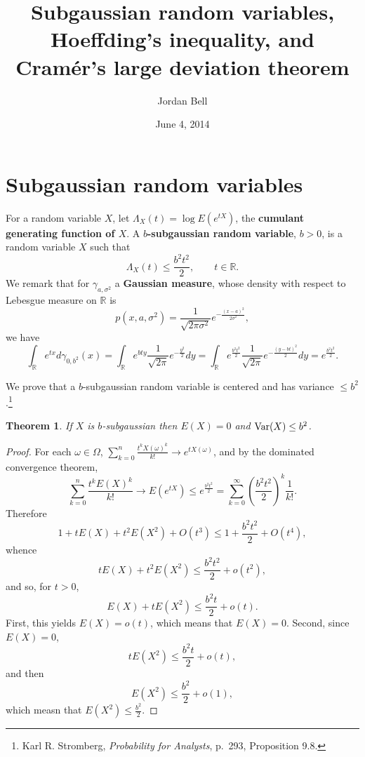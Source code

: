 \documentclass{article}
\newcommand{\Var}{\ensuremath\mathrm{Var}}
\newtheorem{theorem}{Theorem}
\theoremstyle{definition}
\begin{document}
\title{Subgaussian random variables, Hoeffding's inequality, and Cram\'er's large deviation theorem}
\author{Jordan Bell}
\date{June 4, 2014}

\maketitle


\section{Subgaussian random variables}
For a random variable $X$, let $\Lambda_X(t)=\log E(e^{tX})$, the 
\textbf{cumulant generating function of $X$}.
A \textbf{$b$-subgaussian random variable}, $b>0$, is a random variable $X$ such that
\[
\Lambda_X(t) \leq \frac{b^2 t^2}{2}, \qquad t \in \mathbb{R}.
\]
We remark that for $\gamma_{a,\sigma^2}$ a \textbf{Gaussian measure}, whose density with respect to Lebesgue
measure on $\mathbb{R}$ is
\[
p(x,a,\sigma^2)= \frac{1}{\sqrt{2\pi \sigma^2}} e^{-\frac{(x-a)^2}{2\sigma^2}},
\]
we have
\[
\int_\mathbb{R} e^{tx} d\gamma_{0,b^2}(x)
=\int_\mathbb{R} e^{bty} \frac{1}{\sqrt{2\pi}} e^{-\frac{y^2}{2}} dy
=\int_\mathbb{R} e^{\frac{b^2 t^2}{2}} \frac{1}{\sqrt{2\pi}} e^{-\frac{(y-bt)^2}{2}} dy
=e^{\frac{b^2t^2}{2}}.
\]

We prove that a $b$-subgaussian random variable is centered and has variance $\leq b^2$.\footnote{Karl  R. Stromberg,
{\em Probability for Analysts}, p.~293, Proposition 9.8.}


\begin{theorem}
If $X$ is $b$-subgaussian then $E(X)=0$ and $\Var(X) \leq b^2$. 
\end{theorem}
\begin{proof}
For each $\omega \in \Omega$,
$\sum_{k=0}^n \frac{t^k X(\omega)^k}{k!} \to e^{tX(\omega)}$, and by the dominated convergence theorem,
\[
\sum_{k=0}^n \frac{t^k E(X)^k}{k!} \to E(e^{tX}) \leq e^{\frac{b^2t^2}{2}}
=\sum_{k=0}^\infty \left(\frac{b^2 t^2}{2}\right)^k \frac{1}{k!}.
\]
Therefore
\[
1+tE(X)+t^2E(X^2) + O(t^3) \leq 1+\frac{b^2t^2}{2}+O(t^4),
\]
whence
\[
tE(X)+t^2E(X^2) \leq  \frac{b^2t^2}{2} + o(t^2),
\]
and so, for $t>0$,
\[
E(X)+tE(X^2) \leq \frac{b^2 t}{2} + o(t).
\]
First, this yields $E(X) = o(t)$, which means that $E(X)=0$. Second,
since $E(X)=0$, 
\[
tE(X^2) \leq \frac{b^2t}{2}+o(t),
\]
and then
\[
E(X^2) \leq \frac{b^2}{2}+o(1),
\]
which measn that $E(X^2) \leq \frac{b^2}{2}$.
\end{proof}
\end{document}
